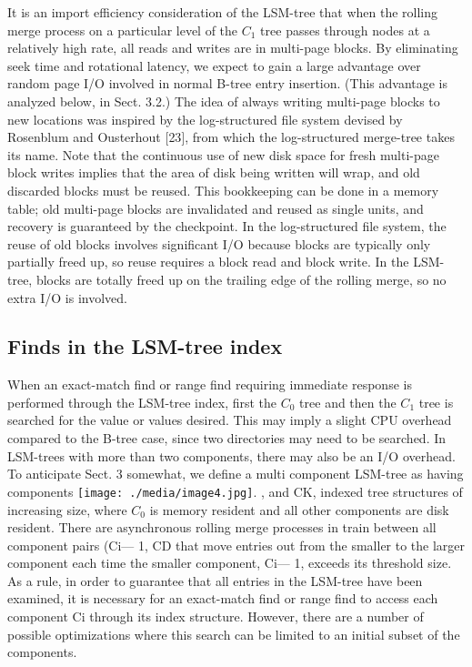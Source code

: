 \documentclass[a4paper,12pt,notitlepage,twoside,openright]{article}
\begin{document}
It is an import efficiency consideration of the LSM-tree that when the
rolling merge process on a particular level of the \(C_1\) tree passes
through nodes at a relatively high rate, all reads and writes are in
multi-page blocks. By eliminating seek time and rotational latency, we
expect to gain a large advantage over random page I/O involved in normal
B-tree entry insertion. (This advantage is analyzed below, in Sect.
3.2.) The idea of always writing multi-page blocks to new locations was
inspired by the log-structured file system devised by Rosenblum and
Ousterhout {[}23{]}, from which the log-structured merge-tree takes its
name. Note that the continuous use of new disk space for fresh
multi-page block writes implies that the area of disk being written will
wrap, and old discarded blocks must be reused. This bookkeeping can be
done in a memory table; old multi-page blocks are invalidated and reused
as single units, and recovery is guaranteed by the checkpoint. In the
log-structured file system, the reuse of old blocks involves significant
I/O because blocks are typically only partially freed up, so reuse
requires a block read and block write. In the LSM-tree, blocks are
totally freed up on the trailing edge of the rolling merge, so no extra
I/O is involved.


\hypertarget{finds-in-the-lsm-tree-index}{%
\subsection{Finds in the LSM-tree
index}\label{finds-in-the-lsm-tree-index}}


When an exact-match find or range find requiring immediate response is
performed through the LSM-tree index, first the \(C_0\) tree and then the \(C_1\)
tree is searched for the value or values desired. This may imply a
slight CPU overhead compared to the B-tree case, since two directories
may need to be searched. In LSM-trees with more than two components,
there may also be an I/O overhead. To anticipate Sect. 3 somewhat, we
define a multi component LSM-tree as having components
\texttt{[image: ./media/image4.jpg]}.
, and CK, indexed tree structures of increasing size, where \(C_0\) is memory
resident and all other components are disk resident. There are
asynchronous rolling merge processes in train between all component
pairs (Ci--- 1, CD that move entries out from the smaller to the larger
component each time the smaller component, Ci--- 1, exceeds its
threshold size. As a rule, in order to guarantee that all entries in the
LSM-tree have been examined, it is necessary for an exact-match find or
range find to access each component Ci through its index structure.
However, there are a number of possible optimizations where this search
can be limited to an initial subset of the components.
\end{document}
